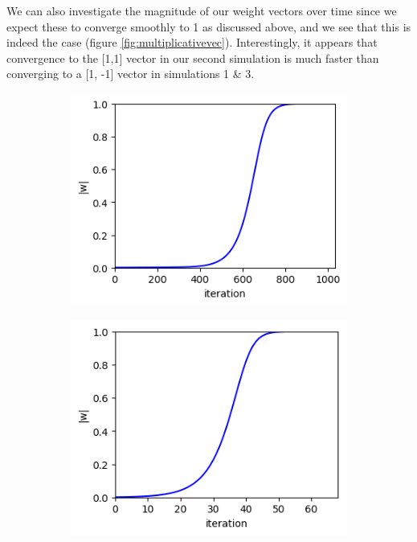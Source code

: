 \documentclass{article}
\begin{document}
We can also investigate the magnitude of our weight vectors over time since we expect these to converge smoothly to 1 as discussed above, and we see that this is indeed the case (figure \ref{fig:multiplicativevec}). Interestingly, it appears that convergence to the [1,1] vector in our second simulation is much faster than converging to a [1, -1] vector in simulations 1 \& 3.

\begin{figure}[h]
	\centering
	\begin{subfigure}[t]{0.28\linewidth}
		\centering
		\includegraphics[width = 1.0\linewidth, trim={0 0 5 5}, clip=true]{figures/newmult_2d_sim1_vec.png}
		\subcaption{}
		\label{fig:sim1vec}	
	\end{subfigure}%
	\hspace{0.05\linewidth}
	\begin{subfigure}[t]{0.28\linewidth}
		\centering
		\includegraphics[width = 1.0\linewidth, trim={0 0 5 5}, clip=true]{figures/newmult_2d_sim2_vec.png}

\end{subfigure}
\end{figure}
\end{document}

